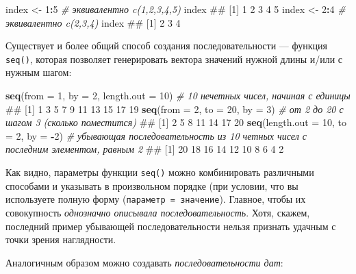 \documentclass[]{book}
\newenvironment{Shaded}{\begin{snugshade}}{\end{snugshade}}
\newcommand{\KeywordTok}[1]{\textcolor[rgb]{0.13,0.29,0.53}{\textbf{#1}}}
\newcommand{\DataTypeTok}[1]{\textcolor[rgb]{0.13,0.29,0.53}{#1}}
\newcommand{\DecValTok}[1]{\textcolor[rgb]{0.00,0.00,0.81}{#1}}
\newcommand{\StringTok}[1]{\textcolor[rgb]{0.31,0.60,0.02}{#1}}
\newcommand{\CommentTok}[1]{\textcolor[rgb]{0.56,0.35,0.01}{\textit{#1}}}
\newcommand{\OperatorTok}[1]{\textcolor[rgb]{0.81,0.36,0.00}{\textbf{#1}}}
\newcommand{\NormalTok}[1]{#1}
\begin{document}
\begin{Shaded}
\begin{Highlighting}[]
\NormalTok{index <-}\StringTok{ }\DecValTok{1}\OperatorTok{:}\DecValTok{5} \CommentTok{# эквивалентно c(1,2,3,4,5)}
\NormalTok{index}
\NormalTok{## [1] 1 2 3 4 5}
\NormalTok{index <-}\StringTok{ }\DecValTok{2}\OperatorTok{:}\DecValTok{4} \CommentTok{# эквивалентно c(2,3,4)}
\NormalTok{index}
\NormalTok{## [1] 2 3 4}
\end{Highlighting}
\end{Shaded}

Существует и более общий способ создания последовательности --- функция
\texttt{seq()}, которая позволяет генерировать вектора значений нужной
длины и/или с нужным шагом:

\begin{Shaded}
\begin{Highlighting}[]
\KeywordTok{seq}\NormalTok{(}\DataTypeTok{from =} \DecValTok{1}\NormalTok{, }\DataTypeTok{by =} \DecValTok{2}\NormalTok{, }\DataTypeTok{length.out =} \DecValTok{10}\NormalTok{) }\CommentTok{# 10 нечетных чисел, начиная с единицы}
\NormalTok{##  [1]  1  3  5  7  9 11 13 15 17 19}
\KeywordTok{seq}\NormalTok{(}\DataTypeTok{from =} \DecValTok{2}\NormalTok{, }\DataTypeTok{to =} \DecValTok{20}\NormalTok{, }\DataTypeTok{by =} \DecValTok{3}\NormalTok{) }\CommentTok{# от 2 до 20 с шагом 3 (сколько поместится)}
\NormalTok{## [1]  2  5  8 11 14 17 20}
\KeywordTok{seq}\NormalTok{(}\DataTypeTok{length.out =} \DecValTok{10}\NormalTok{, }\DataTypeTok{to =} \DecValTok{2}\NormalTok{, }\DataTypeTok{by =} \OperatorTok{-}\DecValTok{2}\NormalTok{) }\CommentTok{# убывающая последовательность из 10 четных чисел с последним элементом, равным 2}
\NormalTok{##  [1] 20 18 16 14 12 10  8  6  4  2}
\end{Highlighting}
\end{Shaded}

Как видно, параметры функции \texttt{seq()} можно комбинировать
различными способами и указывать в произвольном порядке (при условии,
что вы используете полную форму (\texttt{параметр\ =\ значение}).
Главное, чтобы их совокупность \emph{однозначно описывала
последовательность}. Хотя, скажем, последний пример убывающей
последовательности нельзя признать удачным с точки зрения наглядности.

Аналогичным образом можно создавать \emph{последовательности дат}:
\end{document}
